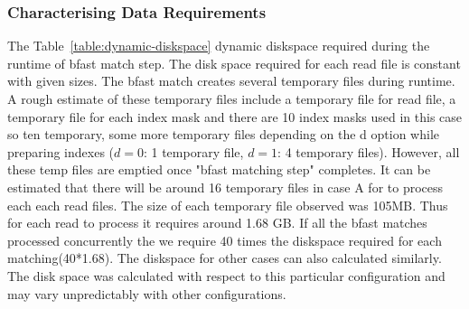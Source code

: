 \documentclass{acm_proc_article-sp}
\begin{document}
 
\subsubsection{Characterising Data Requirements}

The Table~\ref{table:dynamic-diskspace} dynamic diskspace required during the runtime of bfast match step. 
The disk space required for each read file is constant with given sizes. The bfast match creates several 
temporary files during runtime. A rough estimate of these temporary files include a temporary 
file for read file, a temporary file for each index mask and there are 10 index masks used
 in this case so ten temporary, some more temporary files depending on the d option
  while preparing indexes ($d=0$: 1 temporary file, $d=1$: 4 temporary files). 
  However, all these temp files are emptied once "bfast matching step" completes. 
  It can be estimated that there will be around 16 temporary files in case A for to process
   each each read files. The size of each temporary file observed was 105MB. Thus for 
   each read to process it requires around 1.68 GB. If all the bfast matches processed 
   concurrently the we require 40 times the diskspace required for each matching(40*1.68). 
   The diskspace for other cases can also calculated similarly. The disk space was calculated 
   with respect to this particular configuration and may vary unpredictably with other configurations. 
\end{document}
